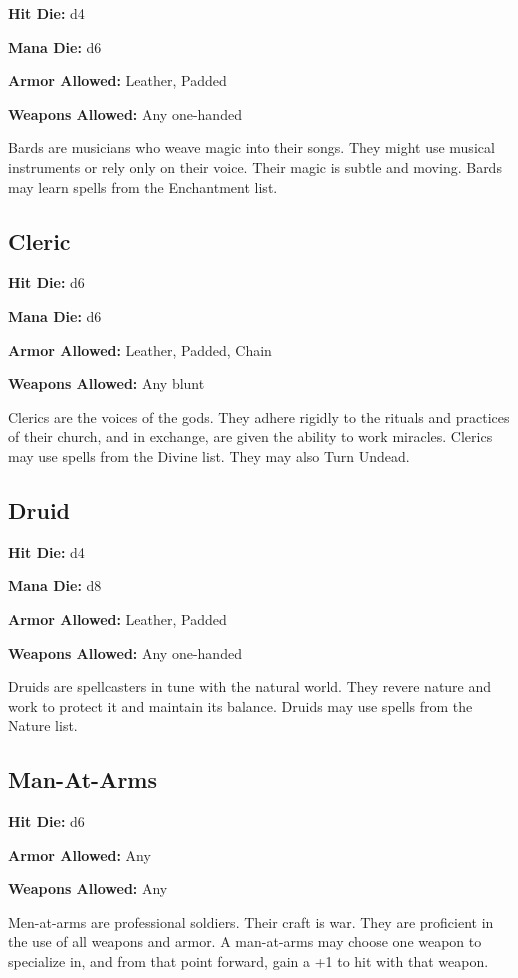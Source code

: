\begin{multicols}{2}
\textbf{Hit Die:} d4

\textbf{Mana Die:} d6

\textbf{Armor Allowed:} Leather, Padded

\textbf{Weapons Allowed:} Any one-handed

Bards are musicians who weave magic into their songs. They might use musical
instruments or rely only on their voice. Their magic is subtle and moving.
Bards may learn spells from the Enchantment list.

\subsection{Cleric}

\textbf{Hit Die:} d6

\textbf{Mana Die:} d6

\textbf{Armor Allowed:} Leather, Padded, Chain

\textbf{Weapons Allowed:} Any blunt

Clerics are the voices of the gods. They adhere rigidly to the rituals and
practices of their church, and in exchange, are given the ability to work
miracles. Clerics may use spells from the Divine list. They may also Turn
Undead.

\subsection{Druid}

\textbf{Hit Die:} d4

\textbf{Mana Die:} d8

\textbf{Armor Allowed:} Leather, Padded

\textbf{Weapons Allowed:} Any one-handed

Druids are spellcasters in tune with the natural world. They revere nature
and work to protect it and maintain its balance. Druids may use spells from
the Nature list.

\subsection{Man-At-Arms}

\textbf{Hit Die:} d6

\textbf{Armor Allowed:} Any

\textbf{Weapons Allowed:} Any

Men-at-arms are professional soldiers. Their craft is war. They are proficient
in the use of all weapons and armor. A man-at-arms may choose one weapon to
specialize in, and from that point forward, gain a +1 to hit with that weapon.


\end{multicols}
